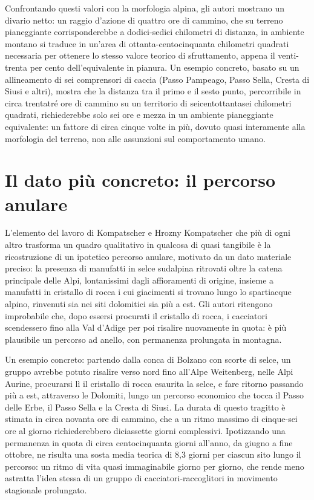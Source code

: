 Confrontando questi valori con la morfologia alpina, gli autori mostrano un divario netto: un raggio d'azione di quattro ore di cammino, che su terreno pianeggiante corrisponderebbe a dodici-sedici chilometri di distanza, in ambiente montano si traduce in un'area di ottanta-centocinquanta chilometri quadrati necessaria per ottenere lo stesso valore teorico di sfruttamento, appena il venti-trenta per cento dell'equivalente in pianura. Un esempio concreto, basato su un allineamento di sei comprensori di caccia (Passo Pampeago, Passo Sella, Cresta di Siusi e altri), mostra che la distanza tra il primo e il sesto punto, percorribile in circa trentatré ore di cammino su un territorio di seicentottantasei chilometri quadrati, richiederebbe solo sei ore e mezza in un ambiente pianeggiante equivalente: un fattore di circa cinque volte in più, dovuto quasi interamente alla morfologia del terreno, non alle assunzioni sul comportamento umano.

\section{Il dato più concreto: il percorso anulare}

L'elemento del lavoro di Kompatscher e Hrozny Kompatscher che più di ogni altro trasforma un quadro qualitativo in qualcosa di quasi tangibile è la ricostruzione di un ipotetico percorso anulare, motivato da un dato materiale preciso: la presenza di manufatti in selce sudalpina ritrovati oltre la catena principale delle Alpi, lontanissimi dagli affioramenti di origine, insieme a manufatti in cristallo di rocca i cui giacimenti si trovano lungo lo spartiacque alpino, rinvenuti sia nei siti dolomitici sia più a est. Gli autori ritengono improbabile che, dopo essersi procurati il cristallo di rocca, i cacciatori scendessero fino alla Val d'Adige per poi risalire nuovamente in quota: è più plausibile un percorso ad anello, con permanenza prolungata in montagna.

Un esempio concreto: partendo dalla conca di Bolzano con scorte di selce, un gruppo avrebbe potuto risalire verso nord fino all'Alpe Weitenberg, nelle Alpi Aurine, procurarsi lì il cristallo di rocca esaurita la selce, e fare ritorno passando più a est, attraverso le Dolomiti, lungo un percorso economico che tocca il Passo delle Erbe, il Passo Sella e la Cresta di Siusi. La durata di questo tragitto è stimata in circa novanta ore di cammino, che a un ritmo massimo di cinque-sei ore al giorno richiederebbero diciassette giorni complessivi. Ipotizzando una permanenza in quota di circa centocinquanta giorni all'anno, da giugno a fine ottobre, ne risulta una sosta media teorica di 8,3 giorni per ciascun sito lungo il percorso: un ritmo di vita quasi immaginabile giorno per giorno, che rende meno astratta l'idea stessa di un gruppo di cacciatori-raccoglitori in movimento stagionale prolungato.

